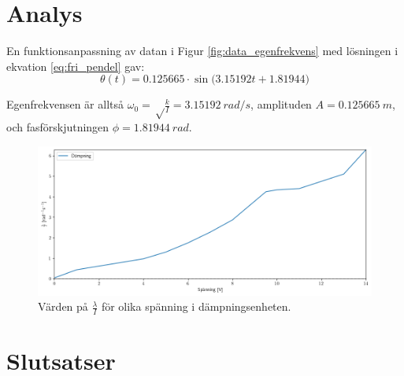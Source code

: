 \documentclass[12pt, a4paper]{article}
\begin{document}
\clearpage
\section{Analys}

En funktionsanpassning av datan i Figur \ref{fig:data_egenfrekvens} med lösningen i ekvation \ref{eq:fri_pendel} gav:
\begin{equation}
    \theta(t)=0.125665\cdot\sin\bigl(3.15192t+1.81944\bigr)
\end{equation}

Egenfrekvensen är alltså $\omega_0=\sqrt\frac{k}{I}=\SI{3.15192}{rad/s}$, amplituden $A=\SI{0.125665}{m}$, och fas\-förskjutningen $\phi=\SI{1.81944}{rad}$.

\begin{figure}[hp]
    \includegraphics[width=\textwidth]{graf_voltage_damping}
    \caption{Värden på $\frac{\lambda}{I}$ för olika spänning i dämpningsenheten.}
    \label{fig:dämpning_över_spänning}
\end{figure}

\section{Slutsatser}
\end{document}
